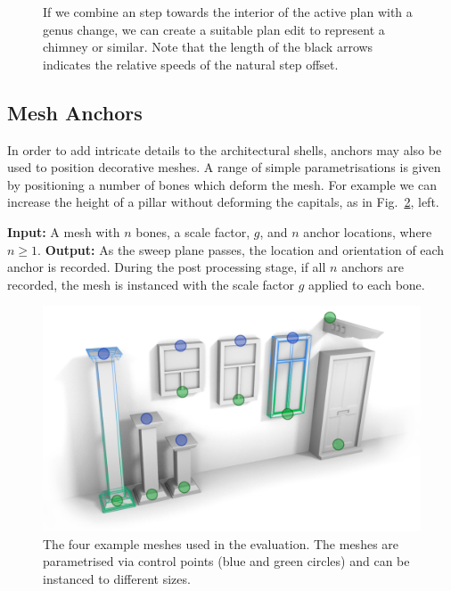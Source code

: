 \begin{figure}
  \centering
  \def\svgwidth{0.8\columnwidth}
  
  \caption[An interior step with a genus change]{\label{fig:pe_grow_chimney}If we combine an step towards the interior of the active plan with a genus change, we can create a suitable plan edit to represent a chimney or similar. Note that the length of the black arrows indicates the relative speeds of the natural step offset.}
\end{figure}

\FloatBarrier
\subsection{Mesh Anchors}

In order to add intricate details to the architectural shells, anchors may also be used to position decorative meshes. A range of simple parametrisations is given by positioning a number of bones which deform the mesh. For example we can increase the height of a pillar without deforming the capitals, as in Fig.~\ref{fig:Meshes}, left.  

{\bf Input:} A mesh with $n$ bones, a scale factor, $g$, and $n$ anchor locations, where $n \geq 1$. 
{\bf Output:} As the sweep plane passes, the location and orientation of each anchor is recorded. During the post processing stage, if all $n$ anchors are recorded, the mesh is instanced with the scale factor $g$ applied to each bone.

\begin{figure}
  \centering
  \includegraphics[width=1.0\columnwidth]{tt_meshes.png}
  \caption[Adding decorative meshes using anchors]{\label{fig:Meshes} The four example meshes used in the evaluation. The meshes are parametrised via control points (blue and green circles) and can be instanced to different sizes.}
\end{figure}

